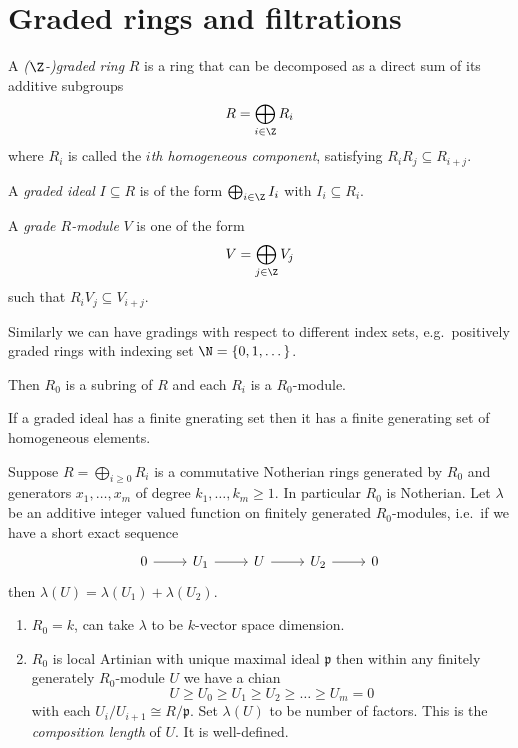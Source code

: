 \documentclass[a4paper]{article}
\begin{document}
\section{Graded rings and filtrations}

\begin{definition}
  A \emph{(\(\Z\)-)graded ring} \(R\) is a ring that can be decomposed as a direct sum of its additive subgroups
  \[
    R = \bigoplus_{i \in \Z} R_i
  \]
  where \(R_i\) is called the \emph{\(i\)th homogeneous component}, satisfying \(R_iR_j \subseteq R_{i + j}\).

  A \emph{graded ideal} \(I \subseteq R\)  is of the form \(\bigoplus_{i \in \Z} I_i\) with \(I_i \subseteq R_i\).

  A \emph{grade \(R\)-module} \(V\) is one of the form
  \[
    V = \bigoplus_{j \in \Z} V_j
  \]
  such that \(R_iV_j \subseteq V_{i + j}\).

  Similarly we can have gradings with respect to different index sets, e.g.\ positively graded rings with indexing set \(\N = \{0, 1, \dots \}\).
\end{definition}

Then \(R_0\) is a subring of \(R\) and each \(R_i\) is a \(R_0\)-module.

\begin{note}
  If a graded ideal has a finite gnerating set then it has a finite generating set of homogeneous elements.
\end{note}

Suppose \(R = \bigoplus_{i \geq 0} R_i\) is a commutative Notherian rings generated by \(R_0\) and generators \(x_1, \dots, x_m\) of degree \(k_1, \dots, k_m \geq 1\). In particular \(R_0\) is Notherian. Let \(\lambda\) be an additive integer valued function on finitely generated \(R_0\)-modules, i.e.\ if we have a short exact sequence
\[
  \begin{tikzcd}
    0 \ar[r] & U_1 \ar[r] & U \ar[r] & U_2 \ar[r] & 0
  \end{tikzcd}
\]
then \(\lambda(U) = \lambda(U_1) + \lambda(U_2)\).

\begin{eg}\leavevmode
  \begin{enumerate}
  \item \(R_0 = k\), can take \(\lambda\) to be \(k\)-vector space dimension.
  \item \(R_0\) is local Artinian with unique maximal ideal \(\mathfrak p\) then within any finitely generately \(R_0\)-module \(U\) we have a chian
    \[
      U \geq U_0 \geq U_1 \geq U_2 \geq \dots \geq U_m = 0
    \]
    with each \(U_i/U_{i + 1} \cong R/\mathfrak p\). Set \(\lambda(U)\) to be number of factors. This is the \emph{composition length} of \(U\). It is well-defined.
  \end{enumerate}
\end{eg}
\end{document}
